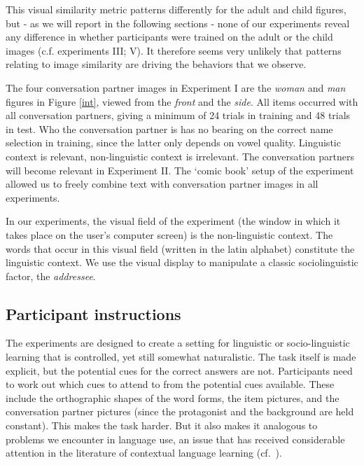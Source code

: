 \documentclass{frontiersSCNS} %
\begin{document}
This visual similarity metric patterns differently for the adult and child figures, but - as we will report in the following sections - none of our experiments reveal any difference in whether participants were trained on the adult or the child images (c.f. experiments III; V).  It therefore seems very unlikely that patterns relating to image similarity are driving the behaviors that we observe.

 The four conversation partner images in Experiment I are the {\it woman } and {\it man} figures in Figure \ref{int}, viewed from the {\it front} and the {\it side}. All items occurred with all conversation partners, giving a minimum of 24 trials in training and 48 trials in test. Who the conversation partner is has no bearing on the correct name selection in training, since the latter only depends on vowel quality. Linguistic context is relevant, non-linguistic context is irrelevant. The conversation partners will become relevant in Experiment II. The `comic book' setup of the experiment allowed us to freely combine text with conversation partner images in all experiments.

In our experiments, the visual field of the experiment (the window in which it takes place on the user's computer screen) is the non-linguistic context. The words that occur in this visual field (written in the latin alphabet) constitute the linguistic context. We use the visual display to manipulate a classic sociolinguistic factor, the {\it addressee}. 

\subsection{Participant instructions}

The experiments are designed to create a setting for linguistic or socio-linguistic  learning that is controlled, yet still somewhat naturalistic. The task itself is made explicit, but the potential cues for the correct answers are not. Participants need to work out which cues to attend to from the potential cues available. These  include the orthographic shapes of the word forms, the item pictures, and the conversation partner pictures (since the protagonist and the background are held constant). This makes the task harder. But it also makes it analogous to problems we encounter in language use, an issue that has received considerable attention in the literature of contextual language learning (cf.\ \citealt{yu2007rapid}).
\end{document}
